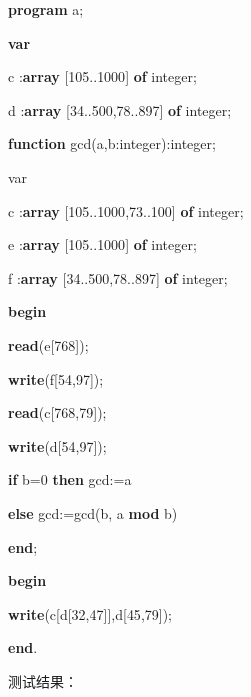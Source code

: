 \documentclass[]{ctexart}
\newenvironment{Shaded}{}{}
\newcommand{\DataTypeTok}[1]{\textcolor[rgb]{0.56,0.13,0.00}{#1}}
\newcommand{\DecValTok}[1]{\textcolor[rgb]{0.25,0.63,0.44}{#1}}
\newcommand{\KeywordTok}[1]{\textcolor[rgb]{0.00,0.44,0.13}{\textbf{#1}}}
\newcommand{\NormalTok}[1]{#1}
\begin{document}
\begin{Shaded}
\begin{Highlighting}[]
\KeywordTok{program}\NormalTok{ a;
}
\KeywordTok{var} 

\NormalTok{    c :}\KeywordTok{array}\NormalTok{ [}\DecValTok{105}\NormalTok{..}\DecValTok{1000}\NormalTok{] }\KeywordTok{of} \DataTypeTok{integer}\NormalTok{;
}
\NormalTok{    d :}\KeywordTok{array}\NormalTok{ [}\DecValTok{34}\NormalTok{..}\DecValTok{500}\NormalTok{,}\DecValTok{78}\NormalTok{..}\DecValTok{897}\NormalTok{] }\KeywordTok{of} \DataTypeTok{integer}\NormalTok{;
}
 \KeywordTok{function}\NormalTok{ gcd(a,b:}\DataTypeTok{integer}\NormalTok{):}\DataTypeTok{integer}\NormalTok{;
}
\NormalTok{ var
}
\NormalTok{    c :}\KeywordTok{array}\NormalTok{ [}\DecValTok{105}\NormalTok{..}\DecValTok{1000}\NormalTok{,}\DecValTok{73}\NormalTok{..}\DecValTok{100}\NormalTok{] }\KeywordTok{of} \DataTypeTok{integer}\NormalTok{;
}
\NormalTok{     e :}\KeywordTok{array}\NormalTok{ [}\DecValTok{105}\NormalTok{..}\DecValTok{1000}\NormalTok{] }\KeywordTok{of} \DataTypeTok{integer}\NormalTok{;
}
\NormalTok{     f :}\KeywordTok{array}\NormalTok{ [}\DecValTok{34}\NormalTok{..}\DecValTok{500}\NormalTok{,}\DecValTok{78}\NormalTok{..}\DecValTok{897}\NormalTok{] }\KeywordTok{of} \DataTypeTok{integer}\NormalTok{;
}
        \KeywordTok{begin} 

         \KeywordTok{read}\NormalTok{(e[}\DecValTok{768}\NormalTok{]);
}
        \KeywordTok{write}\NormalTok{(f[}\DecValTok{54}\NormalTok{,}\DecValTok{97}\NormalTok{]);
}
        \KeywordTok{read}\NormalTok{(c[}\DecValTok{768}\NormalTok{,}\DecValTok{79}\NormalTok{]);
}
        \KeywordTok{write}\NormalTok{(d[}\DecValTok{54}\NormalTok{,}\DecValTok{97}\NormalTok{]);
}
        \KeywordTok{if}\NormalTok{ b=}\DecValTok{0} \KeywordTok{then}\NormalTok{ gcd:=a
}
        \KeywordTok{else}\NormalTok{ gcd:=gcd(b, a }\KeywordTok{mod}\NormalTok{ b)
}
        \KeywordTok{end}\NormalTok{;
}
 \KeywordTok{begin}

    \KeywordTok{write}\NormalTok{(c[d[}\DecValTok{32}\NormalTok{,}\DecValTok{47}\NormalTok{]],d[}\DecValTok{45}\NormalTok{,}\DecValTok{79}\NormalTok{]);
}
 \KeywordTok{end}\NormalTok{.}
\end{Highlighting}
\end{Shaded}

测试结果：
\end{document}
